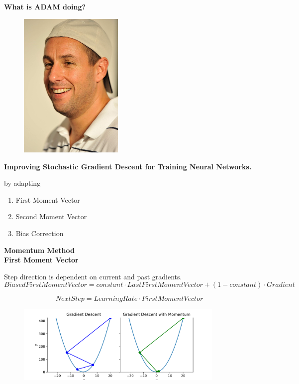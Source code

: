 \documentclass{beamer}
\newcommand\myheading[1]{%
  \par\bigskip
  {\Large\bfseries#1}\par\smallskip}
\begin{document}
\begin{frame}
    \myheading{What is ADAM doing?}
    \begin{figure}[h]
        \includegraphics[width=5cm]{presentation/ADAMS/adam_sandler.jpg}
    \end{figure}
\end{frame}


\begin{frame}
    \myheading{Improving Stochastic Gradient Descent for Training Neural Networks.}
    by adapting
    \begin{enumerate}
        \item First Moment Vector
        \item Second Moment Vector
        \item Bias Correction
    \end{enumerate}
\end{frame}


\begin{frame}
    \myheading{Momentum Method\\First Moment Vector}
    Step direction is dependent on current and past gradients.
    \tiny
    $$Biased First Moment Vector = constant \cdot LastFirstMomentVector + (1-constant) \cdot Gradient$$
    
    $$Next Step = Learning Rate \cdot First Moment Vector  $$
    \begin{figure}[h]
        \includegraphics[width=10cm]{report/figures/GD_momentum.pdf}
    \end{figure}
\end{frame}
\end{document}
